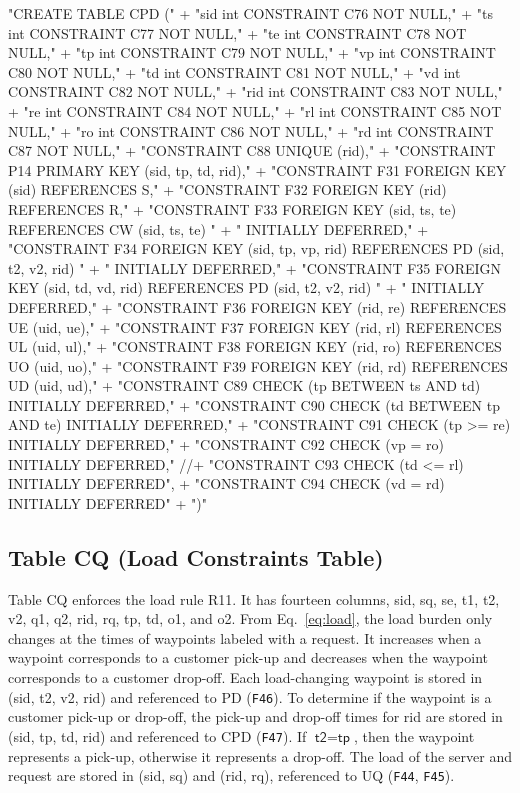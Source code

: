 "CREATE TABLE CPD ("
  + "sid int  CONSTRAINT C76 NOT NULL,"
  + "ts  int  CONSTRAINT C77 NOT NULL,"
  + "te  int  CONSTRAINT C78 NOT NULL,"
  + "tp  int  CONSTRAINT C79 NOT NULL,"
  + "vp  int  CONSTRAINT C80 NOT NULL,"
  + "td  int  CONSTRAINT C81 NOT NULL,"
  + "vd  int  CONSTRAINT C82 NOT NULL,"
  + "rid int  CONSTRAINT C83 NOT NULL,"
  + "re  int  CONSTRAINT C84 NOT NULL,"
  + "rl  int  CONSTRAINT C85 NOT NULL,"
  + "ro  int  CONSTRAINT C86 NOT NULL,"
  + "rd  int  CONSTRAINT C87 NOT NULL,"
  + "CONSTRAINT C88 UNIQUE (rid),"
  + "CONSTRAINT P14 PRIMARY KEY (sid, tp, td, rid),"
  + "CONSTRAINT F31 FOREIGN KEY (sid) REFERENCES S,"
  + "CONSTRAINT F32 FOREIGN KEY (rid) REFERENCES R,"
  + "CONSTRAINT F33 FOREIGN KEY (sid, ts, te) REFERENCES CW (sid, ts, te) "
  + "  INITIALLY DEFERRED,"
  + "CONSTRAINT F34 FOREIGN KEY (sid, tp, vp, rid) REFERENCES PD (sid, t2, v2, rid) "
  + "  INITIALLY DEFERRED,"
  + "CONSTRAINT F35 FOREIGN KEY (sid, td, vd, rid) REFERENCES PD (sid, t2, v2, rid) "
  + "  INITIALLY DEFERRED,"
  + "CONSTRAINT F36 FOREIGN KEY (rid, re) REFERENCES UE (uid, ue),"
  + "CONSTRAINT F37 FOREIGN KEY (rid, rl) REFERENCES UL (uid, ul),"
  + "CONSTRAINT F38 FOREIGN KEY (rid, ro) REFERENCES UO (uid, uo),"
  + "CONSTRAINT F39 FOREIGN KEY (rid, rd) REFERENCES UD (uid, ud),"
  + "CONSTRAINT C89 CHECK (tp BETWEEN ts AND td) INITIALLY DEFERRED,"
  + "CONSTRAINT C90 CHECK (td BETWEEN tp AND te) INITIALLY DEFERRED,"
  + "CONSTRAINT C91 CHECK (tp >= re) INITIALLY DEFERRED,"
  + "CONSTRAINT C92 CHECK (vp  = ro) INITIALLY DEFERRED,"
//+ "CONSTRAINT C93 CHECK (td <= rl) INITIALLY DEFERRED",
  + "CONSTRAINT C94 CHECK (vd  = rd) INITIALLY DEFERRED"
  + ")"
\nwendcode{}\nwdocspar

\subsection{Table CQ (Load Constraints Table)}
Table CQ enforces the load rule R11. It has fourteen columns, \textsf{sid},
\textsf{sq}, \textsf{se}, \textsf{t1}, \textsf{t2}, \textsf{v2}, \textsf{q1},
\textsf{q2}, \textsf{rid}, \textsf{rq}, \textsf{tp}, \textsf{td}, \textsf{o1},
and \textsf{o2}.  From Eq.~\ref{eq:load}, the load burden only changes at the
times of waypoints labeled with a request. It increases when a waypoint
corresponds to a customer pick-up and decreases when the waypoint corresponds
to a customer drop-off. Each load-changing waypoint is stored in (\textsf{sid},
\textsf{t2}, \textsf{v2}, \textsf{rid}) and referenced to PD ({\tt{}F46}).  To
determine if the waypoint is a customer pick-up or drop-off, the pick-up and
drop-off times for \textsf{rid} are stored in (\textsf{sid}, \textsf{tp},
\textsf{td}, \textsf{rid}) and referenced to CPD ({\tt{}F47}).  If
$\textsf{t2}=\textsf{tp}$, then the waypoint represents a pick-up, otherwise it
represents a drop-off. The load of the server and request are stored in
(\textsf{sid}, \textsf{sq}) and (\textsf{rid}, \textsf{rq}), referenced to UQ
({\tt{}F44}, {\tt{}F45}).

